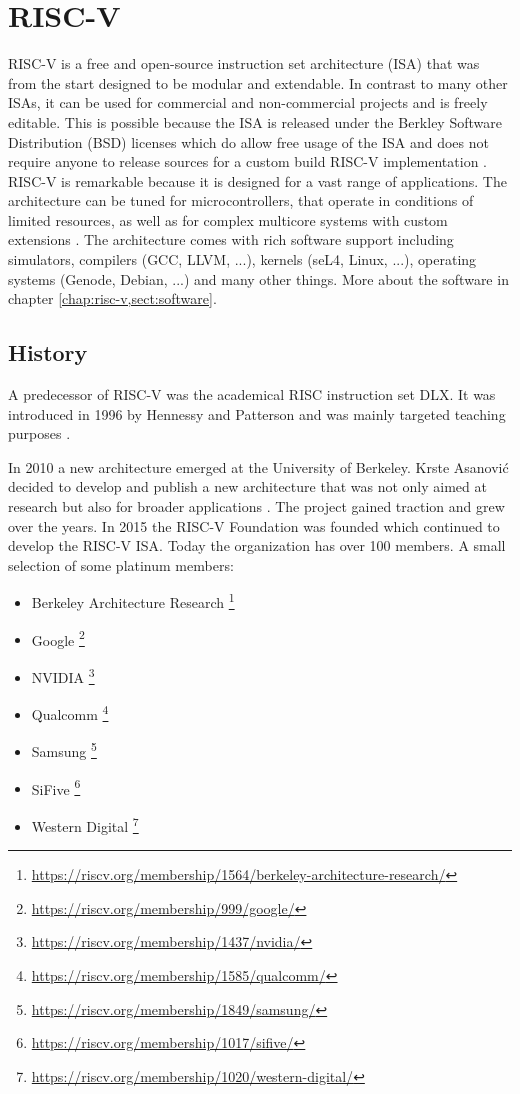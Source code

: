\chapter{RISC-V}\label{chap:risc-v}
RISC-V is a free and open-source instruction set
architecture (ISA) that was from the start designed to
be modular and extendable. In contrast to many other
ISAs, it can be used for commercial and non-commercial
projects and is freely editable.
This is possible because the ISA is released under the
Berkley Software Distribution (BSD) licenses which do
allow free usage of the ISA and does not require anyone
to release sources for a custom build RISC-V
implementation \cite{risc-v_faq}.
RISC-V is remarkable
because it is designed for a vast range of
applications. The architecture can be tuned for 
microcontrollers, that operate in conditions of limited
resources, as well as for complex multicore systems
with custom extensions \cite{youtube_a_case_for_risc-v}.
The architecture comes with
rich software support including simulators,
compilers (GCC, LLVM, ...), kernels (seL4, Linux, ...),
operating systems (Genode, Debian, ...) and many other
things. More about the software in chapter 
\ref{chap:risc-v,sect:software}.

\section{History}
A predecessor of RISC-V was the academical RISC instruction
set DLX. It was introduced in 1996 by Hennessy and Patterson
and was mainly targeted teaching purposes
\cite{9783540468011}.

In 2010 a new architecture emerged at the University of
Berkeley. Krste Asanović decided to develop and publish
a new architecture that was not only aimed at research
but also for broader applications
\cite{Asanovic_EECS-2014-146}. The project gained
traction and grew over the years.
In 2015 the RISC-V Foundation was founded which
continued to develop the RISC-V ISA. Today the
organization has over 100 members. A small selection
of some platinum members:
\begin{itemize}
    \item Berkeley Architecture Research \footnote{ \url{https://riscv.org/membership/1564/berkeley-architecture-research/}}
    \item Google \footnote{\url{https://riscv.org/membership/999/google/}}
    \item NVIDIA \footnote{\url{https://riscv.org/membership/1437/nvidia/}}
    \item Qualcomm \footnote{\url{https://riscv.org/membership/1585/qualcomm/}}
    \item Samsung \footnote{\url{https://riscv.org/membership/1849/samsung/}}
    \item SiFive \footnote{\url{https://riscv.org/membership/1017/sifive/}}
    \item Western Digital \footnote{\url{https://riscv.org/membership/1020/western-digital/}}
\end{itemize}
\cite{risc-v_members}

